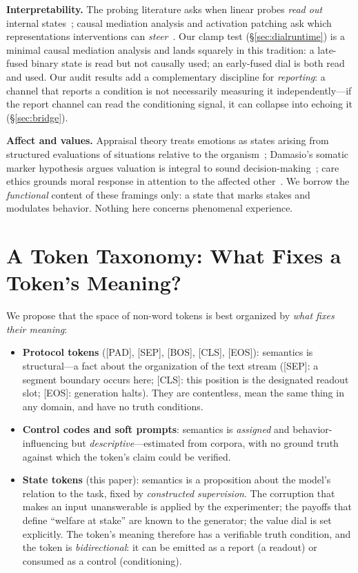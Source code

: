 \documentclass[manuscript, screen, review]{jair}
\begin{document}
\textbf{Interpretability.} The probing literature asks when linear probes \emph{read out} internal states~\citep{belinkov2022probing}; causal mediation analysis and activation patching ask which representations interventions can \emph{steer}~\citep{vig2019investigating,geiger2021causal,meng2022locating}. Our clamp test (\S\ref{sec:dialruntime}) is a minimal causal mediation analysis and lands squarely in this tradition: a late-fused binary state is read but not causally used; an early-fused dial is both read and used. Our audit results add a complementary discipline for \emph{reporting}: a channel that reports a condition is not necessarily measuring it independently---if the report channel can read the conditioning signal, it can collapse into echoing it (\S\ref{sec:bridge}).

\textbf{Affect and values.} Appraisal theory treats emotions as states arising from structured evaluations of situations relative to the organism~\citep{scherer2005emotions}; Damasio's somatic marker hypothesis argues valuation is integral to sound decision-making~\citep{damasio1994descartes}; care ethics grounds moral response in attention to the affected other~\citep{gilligan1982different}. We borrow the \emph{functional} content of these framings only: a state that marks stakes and modulates behavior. Nothing here concerns phenomenal experience.

\section{A Token Taxonomy: What Fixes a Token's Meaning?}
\label{sec:taxonomy}

We propose that the space of non-word tokens is best organized by \emph{what fixes their meaning}:

\begin{itemize}
\item \textbf{Protocol tokens} ([PAD], [SEP], [BOS], [CLS], [EOS]): semantics is structural---a fact about the organization of the text stream ([SEP]: a segment boundary occurs here; [CLS]: this position is the designated readout slot; [EOS]: generation halts). They are contentless, mean the same thing in any domain, and have no truth conditions.
\item \textbf{Control codes and soft prompts}: semantics is \emph{assigned} and behavior-influencing but \emph{descriptive}---estimated from corpora, with no ground truth against which the token's claim could be verified.
\item \textbf{State tokens} (this paper): semantics is a proposition about the model's relation to the task, fixed by \emph{constructed supervision}. The corruption that makes an input unanswerable is applied by the experimenter; the payoffs that define ``welfare at stake'' are known to the generator; the value dial is set explicitly. The token's meaning therefore has a verifiable truth condition, and the token is \emph{bidirectional}: it can be emitted as a report (a readout) or consumed as a control (conditioning).
\end{itemize}
\end{document}
